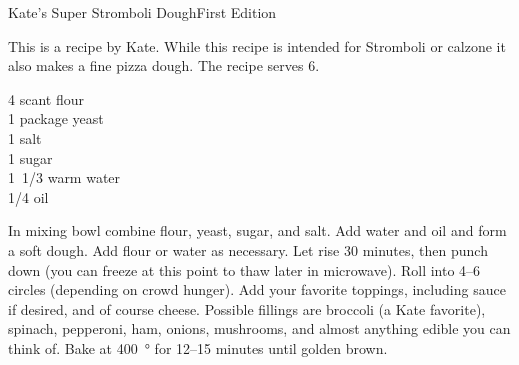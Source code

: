 \begin{entry}{Kate's Super Stromboli Dough}{First Edition}

\begin{open}
  This is a recipe by Kate.  While this recipe is intended for Stromboli
  or calzone it also makes a fine pizza dough.  The
  recipe serves 6.
\end{open}
\begin{ingredients}
  4 scant \si{\cup} flour \\
  1 package  yeast \\
  \SI{1}{\teaspoon} salt \\
  \SI{1}{\tblspoon} sugar \\
  \SI{1/3}[1]{\cup} warm water \\
  \SI{1/4}{\cup} oil
\end{ingredients}
In mixing bowl combine flour, yeast, sugar, and salt.  Add water and oil and
form a soft dough. Add flour or water as necessary.  Let rise 30 minutes, then
punch down (you can freeze at this point to thaw later in microwave).  Roll
into \numrange{4}{6} circles (depending on crowd hunger). Add your favorite
toppings, including sauce if desired, and of course cheese. Possible fillings
are broccoli (a Kate favorite), spinach, pepperoni, ham, onions, mushrooms,
and almost anything edible you can think of. Bake at \SI{400}{\degree} for
\numrange{12}{15} minutes until golden brown.
\end{entry}

